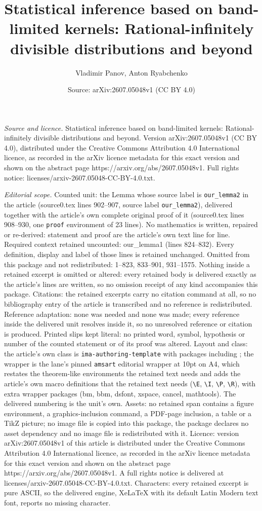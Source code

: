 \documentclass[10pt,a4paper]{amsart}
\title[Statistical inference based on band-limited kernels: Rationa]{Statistical inference based on band-limited kernels: Rational-infinitely divisible distributions and beyond}
\author{Vladimir Panov, Anton Ryabchenko}
\date{Source: arXiv:2607.05048v1 (CC BY 4.0)}
\begin{document}
\maketitle

\noindent\emph{Source and licence.} Statistical inference based on band-limited kernels: Rational-infinitely divisible distributions and beyond. Version arXiv:2607.05048v1 (CC BY 4.0), distributed under the Creative Commons Attribution 4.0 International licence, as recorded in the arXiv licence metadata for this exact version and shown on the abstract page https://arxiv.org/abs/2607.05048v1. Full rights notice: licenses/arxiv-2607.05048-CC-BY-4.0.txt.\par\smallskip

\noindent\textit{Editorial scope.} Counted unit: the Lemma whose source label is \texttt{our\_lemma2} in the article (source0.tex lines 902--907, source label \texttt{our\_lemma2}), delivered together with the article's own complete original proof of it (source0.tex lines 908--930, one \texttt{proof} environment of 23 lines). No mathematics is written, repaired or re-derived: statement and proof are the article's own text line for line. Required context retained uncounted: our\_lemma1 (lines 824--832). Every definition, display and label of those lines is retained unchanged. Omitted from this package and not redistributed: 1--823, 833--901, 931--1575. Nothing inside a retained excerpt is omitted or altered: every retained body is delivered exactly as the article's lines are written, so no omission receipt of any kind accompanies this package. Citations: the retained excerpts carry no citation command at all, so no bibliography entry of the article is transcribed and no reference is redistributed. Reference adaptation: none was needed and none was made; every reference inside the delivered unit resolves inside it, so no unresolved reference or citation is produced. Printed slips kept literal: no printed word, symbol, hypothesis or number of the counted statement or of its proof was altered. Layout and class: the article's own class is \texttt{ima-authoring-template} with packages including ; the wrapper is the lane's pinned \texttt{amsart} editorial wrapper at 10pt on A4, which restates the theorem-like environments the retained text needs and adds the article's own macro definitions that the retained text needs (\texttt{\textbackslash E}, \texttt{\textbackslash I}, \texttt{\textbackslash P}, \texttt{\textbackslash R}), with extra wrapper packages (bm, bbm, dsfont, xspace, cancel, mathtools). The delivered numbering is the unit's own. Assets: no retained span contains a figure environment, a graphics-inclusion command, a PDF-page inclusion, a table or a TikZ picture; no image file is copied into this package, the package declares no asset dependency and no image file is redistributed with it. Licence: version arXiv:2607.05048v1 of this article is distributed under the Creative Commons Attribution 4.0 International licence, as recorded in the arXiv licence metadata for this exact version and shown on the abstract page https://arxiv.org/abs/2607.05048v1. A full rights notice is delivered at licenses/arxiv-2607.05048-CC-BY-4.0.txt. Characters: every retained excerpt is pure ASCII, so the delivered engine, XeLaTeX with its default Latin Modern text font, reports no missing character.
\end{document}
